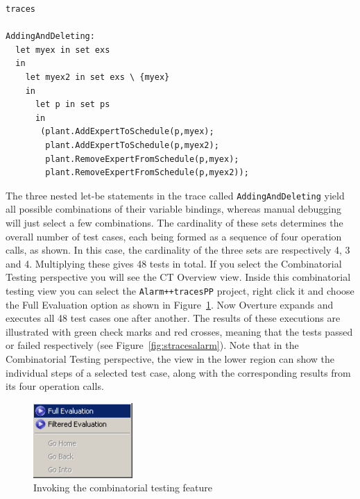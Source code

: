 \begin{lstlisting}
traces

AddingAndDeleting:
  let myex in set exs
  in
    let myex2 in set exs \ {myex}
    in
      let p in set ps
      in
       (plant.AddExpertToSchedule(p,myex);
        plant.AddExpertToSchedule(p,myex2);
        plant.RemoveExpertFromSchedule(p,myex);
        plant.RemoveExpertFromSchedule(p,myex2));
\end{lstlisting}

\noindent The three nested let-be statements in the trace called \texttt{AddingAndDeleting} yield all possible combinations of their variable bindings, whereas manual debugging will just select a few combinations.  The cardinality of these sets determines the overall number of test cases, each being formed as a sequence of four operation calls, as shown. In this case, the cardinality of the three sets are respectively 4, 3 and 4. Multiplying these gives 48 tests in total. If you select the Combinatorial Testing perspective you will see the \textsf{CT Overview} view. Inside this combinatorial testing view you can select the \texttt{Alarm++tracesPP} project, right click it and choose the \textsf{Full Evaluation} option as shown in Figure~\ref{fig:CToptions}. Now Overture expands and executes all 48 test cases one after another. The results of these executions are illustrated with green check marks and red crosses, meaning that the tests passed or failed respectively (see Figure~\ref{fig:stracesalarm}). Note that in the Combinatorial Testing perspective, the view in the lower region can show the individual steps of a selected test case, along with the corresponding results from its four operation calls.
%
\begin{figure}[htbp]
\begin{center}
\includegraphics[width=1.5in]{figures/CToptions}
\caption{Invoking the combinatorial testing feature\label{fig:CToptions}}
\end{center}
\end{figure}
%
